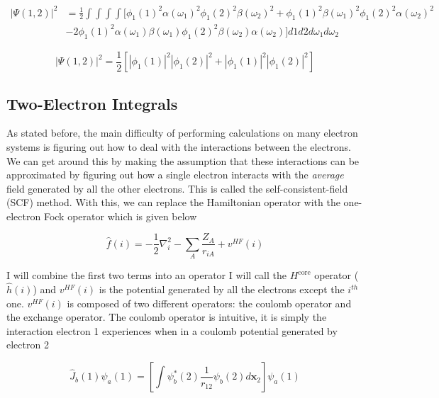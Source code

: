 \documentclass[12pt]{report}
\begin{document}
\begin{equation}
\label{eq:el_prob_dist_3}
\begin{split}
|\Psi(1,2)|^{2}	&	=
\frac{1}{2}\int\int\int\int
[
\phi_{1}(1)^{2}\alpha(\omega_{1})^{2}\phi_{1}(2)^{2}\beta(\omega_{2})^{2} +
\phi_{1}(1)^{2}\beta(\omega_{1})^{2}\phi_{1}(2)^{2}\alpha(\omega_{2})^{2}
	\\
	&	-2
\phi_{1}(1)^{2}\alpha(\omega_{1})\beta(\omega_{1})\phi_{1}(2)^{2}\beta(\omega_{2})\alpha(\omega_{2})
]d1d2d\omega_{1}d\omega_{2}
\end{split}
\end{equation}

\begin{equation}
\label{eq:el_prob_dist_4}
|\Psi(1,2)|^{2} =
\frac{1}{2}
\left[
|\phi_{1}(1)|^{2}|\phi_{1}(2)|^{2} + |\phi_{1}(1)|^{2}|\phi_{1}(2)|^{2}
\right]
\end{equation}

\subsection{Two-Electron Integrals}
As stated before, the main difficulty of performing calculations on many electron systems is figuring out how to deal with the interactions between the electrons. We can get around this by making the assumption that these interactions can be approximated by figuring out how a single electron interacts with the \textit{average} field generated by all the other electrons. This is called the self-consistent-field (SCF) method. With this, we can replace the Hamiltonian operator with the one-electron Fock operator which is given below

\begin{equation}
\label{eq:fock_op}
\hat{f}(i) = -\frac{1}{2}\nabla^{2}_{i}  - \sum_{A}\frac{Z_{A}}{r_{iA}} + v^{HF}(i)
\end{equation} 

I will combine the first two terms into an operator I will call the $H^{\text{core}}$ operator ($\hat{h}(i)$) and $v^{HF}(i)$ is the potential generated by all the electrons except the $i^{th}$ one. $v^{HF}(i)$ is composed of two different operators: the coulomb operator and the exchange operator. The coulomb operator is intuitive, it is simply the interaction electron 1 experiences when in a coulomb potential generated by electron 2

\begin{equation}
\label{eq:coulomb_op}
\hat{J}_{b}(1)\psi_{a}(1)=\left[\int\psi^{*}_{b}(2)\frac{1}{r_{12}}\psi_{b}(2)d\textbf{x}_{2}\right]\psi_{a}(1)
\end{equation} 
\end{document}
